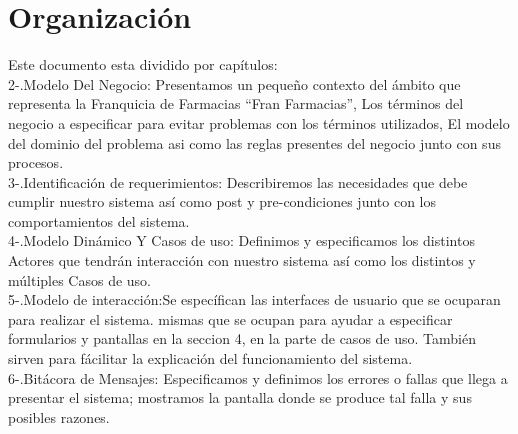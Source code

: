 \section{Organización}
Este documento esta dividido por capítulos:\\
2-.Modelo Del Negocio: Presentamos un pequeño contexto del ámbito que representa la Franquicia de Farmacias ``Fran Farmacias'', Los términos del negocio a especificar para evitar problemas con los términos utilizados, El modelo del dominio del problema asi como las reglas presentes del negocio junto con sus procesos.\\
3-.Identificación de requerimientos: Describiremos las necesidades que debe cumplir nuestro sistema así como post y pre-condiciones junto con los comportamientos del sistema.\\
4-.Modelo Dinámico Y Casos de uso: Definimos y especificamos los distintos Actores que tendrán interacción con nuestro sistema así como los distintos y múltiples Casos de uso.\\
5-.Modelo de interacción:Se específican las interfaces de usuario que se ocuparan para realizar el sistema.
mismas que se ocupan para ayudar a especificar formularios y pantallas en la seccion 4, en la parte de casos de uso.
También sirven para fácilitar la explicación del funcionamiento del sistema.\\
6-.Bitácora de Mensajes: Especificamos y definimos los errores o fallas que llega a presentar el sistema; mostramos la pantalla donde se produce tal falla y sus posibles razones.\\ 

